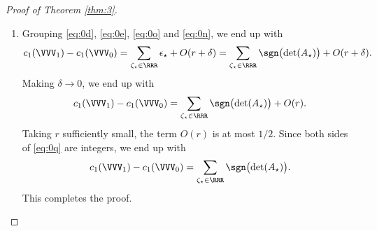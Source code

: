 \begin{proof}[Proof of Theorem \ref{thm:3}]
\begin{enumerate}
We define more appropriate coordinates
\begin{equation}\label{eq:0k}
\txi_1 = \dfrac{t_{12}\delta + t_{22}\xi_1}{t_{11}\delta}, \quad \txi_2 = \dfrac{t_{13}\delta + t_{23}\xi_1 + t_{33}\xi_2}{t_{11}\delta}.
\end{equation}
Using invariance of two-forms under change of coordinates, $b_0(\xi)d\xi = \tb_0(\txi)d\txi$, where $\tb_0(\pm \delta,\txi) d\xi$ is the two-form associated to the negative eigenspace of
\[
\epsilon_\star \delta \cdot t_{11} \bigl( \sigma_1 + \sigma_2 \txi_1 + \sigma_3 \txi_2 \bigr).
\]
This setup allows us to apply \cite[(23)]{FC13}, which gives:
\begin{equation*}
\tb_0(\pm \delta,\txi) = \dfrac{i\epsilon_\star^3 (\pm\delta)^3}{2\delta^3\bigl(\txi^2_1 + \txi_2^2 + 1\bigr)^{3/2}} \matrice{1 \\ \txi_1\\ \txi_2 } \cdot \matrice{0 \\ 1 \\ 0} \wedge \matrice{0 \\ 0 \\ 1} = \dfrac{\pm\epsilon_\star}{2\bigl(\txi^2_1 + \txi_2^2 + 1\bigr)^{3/2}}.
\end{equation*}
Under the change of coordinates \eqref{eq:0k}, the disk $|\xi| \leq r$ gets mapped to an ellipse centered at distance $O(1)$ from the origin, of dimensions $\sim \delta^{-1}$. Thus,
\begin{equation}\label{eq:0n}
\int_{|\xi| \leq r} b_0(\pm\delta,\xi) d\xi = \int_{\R^2} b_0(\pm\delta,\xi) d\xi + O(\delta) = \pm \epsilon_\star \pi + O(\delta).
\end{equation}
We refer to the proof of \cite[Lem.\,2.5]{D19b} for details.

\item
Grouping \eqref{eq:0d}, \eqref{eq:0e}, \eqref{eq:0o} and \eqref{eq:0n}, we end up with
\begin{equation*}
c_1(\VVV_1)-c_1(\VVV_0) = \sum_{\zeta_\star \in \RRR} \epsilon_\star + O(r+\delta) = \sum_{\zeta_\star \in \RRR} \sgn\bigl(\det(A_\star)\bigr) + O(r+\delta).
\end{equation*}
Making $\delta \to 0$, we end up with
\begin{equation}\label{eq:0q}
c_1(\VVV_1)-c_1(\VVV_0) = \sum_{\zeta_\star \in \RRR} \sgn\bigl(\det(A_\star)\bigr) + O(r).
\end{equation}
Taking $r$ sufficiently small, the term $O(r)$ is at most $1/2$. Since both sides of \eqref{eq:0q} are integers, we end up with
\begin{equation*}
c_1(\VVV_1)-c_1(\VVV_0) = \sum_{\zeta_\star \in \RRR} \sgn\bigl(\det(A_\star)\bigr).
\end{equation*}
This completes the proof.\qedhere
\end{enumerate}
\end{proof}

